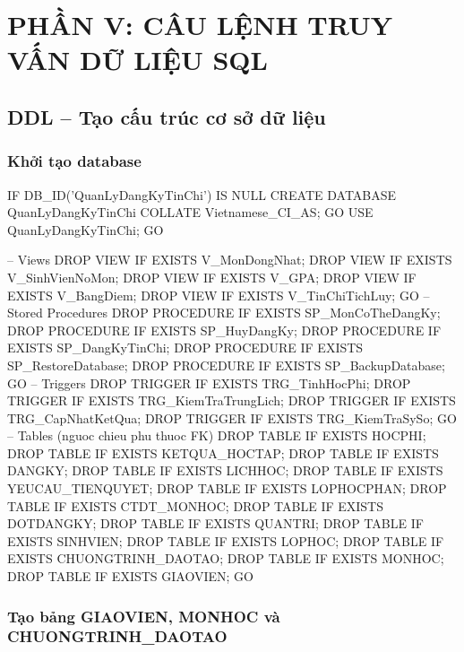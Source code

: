 \documentclass[13pt, a4paper]{article}
\begin{document}
\newpage
\section{PHẦN V: CÂU LỆNH TRUY VẤN DỮ LIỆU SQL}

\subsection{DDL -- Tạo cấu trúc cơ sở dữ liệu}

\subsubsection{Khởi tạo database}

\begin{sqlbox}
IF DB_ID('QuanLyDangKyTinChi') IS NULL
    CREATE DATABASE QuanLyDangKyTinChi COLLATE Vietnamese_CI_AS;
GO
USE QuanLyDangKyTinChi;
GO

-- Views
DROP VIEW IF EXISTS V_MonDongNhat; DROP VIEW IF EXISTS V_SinhVienNoMon;
DROP VIEW IF EXISTS V_GPA;         DROP VIEW IF EXISTS V_BangDiem;
DROP VIEW IF EXISTS V_TinChiTichLuy;
GO
-- Stored Procedures
DROP PROCEDURE IF EXISTS SP_MonCoTheDangKy;  DROP PROCEDURE IF EXISTS SP_HuyDangKy;
DROP PROCEDURE IF EXISTS SP_DangKyTinChi;    DROP PROCEDURE IF EXISTS SP_RestoreDatabase;
DROP PROCEDURE IF EXISTS SP_BackupDatabase;
GO
-- Triggers
DROP TRIGGER IF EXISTS TRG_TinhHocPhi;    DROP TRIGGER IF EXISTS TRG_KiemTraTrungLich;
DROP TRIGGER IF EXISTS TRG_CapNhatKetQua; DROP TRIGGER IF EXISTS TRG_KiemTraSySo;
GO
-- Tables (nguoc chieu phu thuoc FK)
DROP TABLE IF EXISTS HOCPHI;          DROP TABLE IF EXISTS KETQUA_HOCTAP;
DROP TABLE IF EXISTS DANGKY;          DROP TABLE IF EXISTS LICHHOC;
DROP TABLE IF EXISTS YEUCAU_TIENQUYET; DROP TABLE IF EXISTS LOPHOCPHAN;
DROP TABLE IF EXISTS CTDT_MONHOC;     DROP TABLE IF EXISTS DOTDANGKY;
DROP TABLE IF EXISTS QUANTRI;         DROP TABLE IF EXISTS SINHVIEN;
DROP TABLE IF EXISTS LOPHOC;          DROP TABLE IF EXISTS CHUONGTRINH_DAOTAO;
DROP TABLE IF EXISTS MONHOC;          DROP TABLE IF EXISTS GIAOVIEN;
GO
\end{sqlbox}

\subsubsection{Tạo bảng GIAOVIEN, MONHOC và CHUONGTRINH\_DAOTAO}
\end{document}
